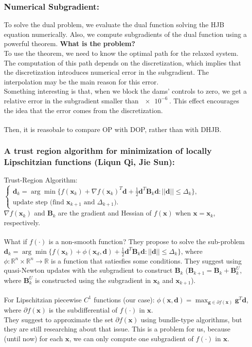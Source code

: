 \documentclass[aspectratio=169]{beamer}\usepackage[utf8]{inputenc}
\newcommand{\R}{\mathbb{R}}
\begin{document}
\begin{frame}\frametitle{Numerical Subgradient:}

To solve the dual problem, we evaluate the dual function solving the HJB equation numerically. Also, we compute subgradients of the dual function using a powerful theorem. \textbf{What is the problem?}\\
To use the theorem, we need to know the optimal path for the relaxed system. The computation of this path depends on the discretization, which implies that the discretization introduces numerical error in the subgradient. The interpolation may be the main reason for this error.\\
Something interesting is that, when we block the dams' controls to zero, we get a relative error in the subgradient smaller than $\SI{e-6}{}$. This effect encourages the idea that the error comes from the discretization.\\
\quad\\
Then, it is reasobale to compare \alert{OP} with \alert{DOP}, rather than with \alert{DHJB}.

\end{frame}

\begin{frame}\frametitle{{\small A trust region algorithm for minimization of locally Lipschitzian functions (Liqun Qi, Jie Sun):}}

Trust-Region Algorithm: $\begin{cases}\bm{d}_k=\arg\min\{f(\bm{x}_k)+\nabla f(\bm{x}_k)^T\bm{d}+\frac{1}{2}\bm{d}^T\bm{B}_k\bm{d}:||\bm{d}||\leq\Delta_k\},\\
\text{update step (find $\bm{x}_{k+1}$ and $\Delta_{k+1}$).}\end{cases}$\\
$\nabla f(\bm{x}_k)$ and $\bm{B}_k$ are the gradient and Hessian of $f(\bm{x})$ when $\bm{x}=\bm{x}_k$, respectively.\\
\quad\\
What if $f(\cdot)$ is a non-smooth function? They propose to solve the sub-problem $\bm{d}_k=\arg\min\{f(\bm{x}_k)+\phi(\bm{x}_d,\bm{d})+\frac{1}{2}\bm{d}^T\bm{B}_k\bm{d}:||\bm{d}||\leq\Delta_k\}$, where $\phi:\R^n\times\R^n\to\R$ is a function that satiesfies some conditions. They suggest using quasi-Newton updates with the subgradient to construct $\bm{B}_k$ ($\bm{B}_{k+1}=\bm{B}_{k}+\bm{B}_{k}^U$, where $\bm{B}_k^U$ is constructed using the subgradient in $\bm{x}_k$ and $\bm{x}_{k+1}$).\\
\quad\\
For Lipschitzian piecewise $C^1$ functions (our case): $\phi(\bm{x},\bm{d})=\max_{\bm{g}\in\partial f(\bm{x})}\bm{g}^T\bm{d}$, where $\partial f(\bm{x})$ is the subdifferential of $f(\cdot)$ in $\bm{x}$.\\
They suggest to approximate the set $\partial f(\bm{x})$ using bundle-type algorithms, \alert{but they are still researching about that issue}. This is a problem for us, because (until now) for each $\bm{x}$, we can only compute one subgradient of $f(\cdot)$ in $\bm{x}$.

\end{frame}
\end{document}
